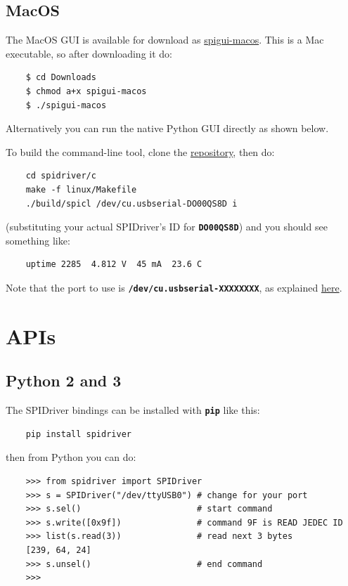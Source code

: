 \documentclass{article}
\newcommand{\mach}[1]{\texttt{\textbf{#1}}}
\begin{document}
\subsection{MacOS}

The MacOS GUI is available for download as
\href{https://spidriver.com/mac}{spigui-macos}.
This is a Mac executable, so after downloading it do:
\begin{lstlisting}
    $ cd Downloads
    $ chmod a+x spigui-macos
    $ ./spigui-macos
\end{lstlisting}

Alternatively you can run the native Python GUI directly as shown below.

\index{spicl@\mach{spicl}}
To  build the command-line tool, clone the
\href{https://github.com/jamesbowman/spidriver}{repository}, then do:

\begin{lstlisting}
    cd spidriver/c
    make -f linux/Makefile
    ./build/spicl /dev/cu.usbserial-DO00QS8D i
\end{lstlisting}

(substituting your actual SPIDriver's ID for \mach{DO00QS8D})
and you should see something like:
\begin{lstlisting}
    uptime 2285  4.812 V  45 mA  23.6 C
\end{lstlisting}

Note that the port to use is \mach{/dev/cu.usbserial-XXXXXXXX}, as explained
\href{https://pbxbook.com/other/mac-tty.html}{here}.

\section{APIs}
\subsection{Python 2 and 3}

The SPIDriver bindings can be installed with \mach{pip} like this:

\begin{lstlisting}
    pip install spidriver
\end{lstlisting}

then from Python you can do:

\begin{lstlisting}
    >>> from spidriver import SPIDriver
    >>> s = SPIDriver("/dev/ttyUSB0") # change for your port
    >>> s.sel()                       # start command
    >>> s.write([0x9f])               # command 9F is READ JEDEC ID 
    >>> list(s.read(3))               # read next 3 bytes
    [239, 64, 24]
    >>> s.unsel()                     # end command
    >>>
\end{lstlisting}
\end{document}
